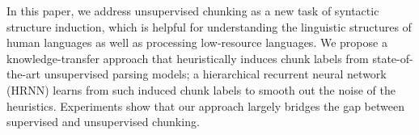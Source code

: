 In this paper, we address unsupervised chunking as a new task of syntactic structure induction, which is helpful for understanding the linguistic structures of human languages as well as processing low-resource languages. We propose a knowledge-transfer approach that heuristically induces chunk labels from state-of-the-art unsupervised parsing models; a hierarchical recurrent neural network (HRNN) learns from such induced chunk labels to smooth out the noise of the heuristics. Experiments show that our approach largely bridges the gap between supervised and unsupervised chunking.
